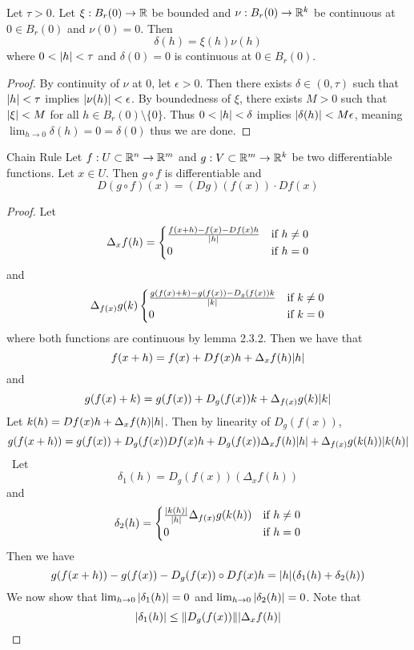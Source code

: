 \documentclass[a4paper]{article}
\begin{document}
\begin{lmm}{}{} Let $\tau>0$. Let $\xi:B_r(0)\to\mathbb{R}$ be bounded and $\nu:B_r(0)\to\mathbb{R}^k$ be continuous at $0\in B_r(0)$ and $\nu(0)=0$. Then $$\delta(h)=\xi(h)\nu(h)$$ where $0<\abs{h}<\tau$ and $\delta(0)=0$ is continuous at $0\in B_r(0)$. \tcbline
\begin{proof}
By continuity of $\nu$ at $0$, let $\epsilon>0$. Then there exists $\delta\in(0,\tau)$ such that $\abs{h}<\tau$ implies $\abs{\nu(h)}<\epsilon$. By boundedness of $\xi$, there exists $M>0$ such that $\abs{\xi}<M$ for all $h\in B_r(0)\setminus\{0\}$. Thus $0<\abs{h}<\delta$ implies $\abs{\delta(h)}<M\epsilon$, meaning $\lim_{h\to 0}\delta(h)=0=\delta(0)$ thus we are done. 
\end{proof}
\end{lmm}

\begin{prp}{Chain Rule}{} Let $f:U\subset\mathbb{R}^n\to\mathbb{R}^m$ and $g:V\subset\mathbb{R}^m\to\mathbb{R}^k$ be two differentiable functions. Let $x \in U$. Then $g\circ f$ is differentiable and $$D(g\circ f)(x)=(Dg)(f(x))\cdot Df(x)$$ \tcbline
\begin{proof}
Let $$\Delta_xf(h)=\begin{cases}
\frac{f(x+h)-f(x)-Df(x)h}{\abs{h}} & \text{if } h\neq 0\\
0 & \text{if } h=0
\end{cases}$$ and $$\Delta_{f(x)}g(k)\begin{cases}
\frac{g(f(x)+k)-g(f(x))-D_g(f(x))k}{\abs{k}} & \text{if } k\neq 0\\
0 & \text{if } k=0
\end{cases}$$ where both functions are continuous by lemma 2.3.2. Then we have that $$f(x+h)=f(x)+Df(x)h+\Delta_xf(h)\abs{h}$$ and $$g(f(x)+k)=g(f(x))+D_g(f(x))k+\Delta_{f(x)}g(k)\abs{k}$$ Let $k(h)=Df(x)h+\Delta_xf(h)\abs{h}$. Then by linearity of $D_g(f(x))$, $$g(f(x+h))=g(f(x))+D_g(f(x))Df(x)h+D_g(f(x))\Delta_xf(h)\abs{h}+\Delta_{f(x)}g(k(h))\abs{k(h)}$$\
Let $$\delta_1(h)=D_g(f(x))(\Delta_xf(h))$$ and $$\delta_2(h)=\begin{cases}
\frac{\abs{k(h)}}{\abs{h}}\Delta_{f(x)}g(k(h)) & \text{if }h\neq 0\\
0 & \text{if }h=0
\end{cases}$$
Then we have $$g(f(x+h))-g(f(x))-D_g(f(x))\circ Df(x)h=\abs{h}(\delta_1(h)+\delta_2(h))$$
\linebreak
We now show that $\lim_{h\to 0}\abs{\delta_1(h)}=0$ and $\lim_{h\to 0}\abs{\delta_2(h)}=0$. Note that $$\abs{\delta_1(h)}\leq\|D_g(f(x))\|\abs{\Delta_xf(h)}$$

\end{proof}
\end{prp}
\end{document}

